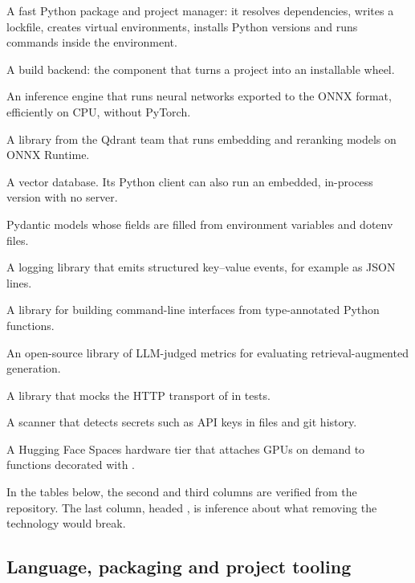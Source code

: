 \begin{background}
\begin{description}[style=sameline,leftmargin=3.3cm,font=\normalfont\bfseries]
  \item[uv] A fast Python package and project manager: it resolves dependencies, writes a lockfile, creates virtual environments, installs Python versions and runs commands inside the environment.
  \item[hatchling] A build backend: the component that turns a  project into an installable wheel.
  \item[ONNX Runtime] An inference engine that runs neural networks exported to the ONNX format, efficiently on CPU, without PyTorch.
  \item[fastembed] A library from the Qdrant team that runs embedding and reranking models on ONNX Runtime.
  \item[Qdrant] A vector database. Its Python client can also run an embedded, in-process version with no server.
  \item[pydantic-settings] Pydantic models whose fields are filled from environment variables and dotenv files.
  \item[structlog] A logging library that emits structured key--value events, for example as JSON lines.
  \item[Typer] A library for building command-line interfaces from type-annotated Python functions.
  \item[RAGAS] An open-source library of LLM-judged metrics for evaluating retrieval-augmented generation.
  \item[respx] A library that mocks the HTTP transport of  in tests.
  \item[gitleaks] A scanner that detects secrets such as API keys in files and git history.
  \item[ZeroGPU] A Hugging Face Spaces hardware tier that attaches GPUs on demand to functions decorated with .
\end{description}
\end{background}

In the tables below, the second and third columns are verified from the repository. The last column, headed \tagI, is inference about what removing the technology would break.

\subsection{Language, packaging and project tooling}

